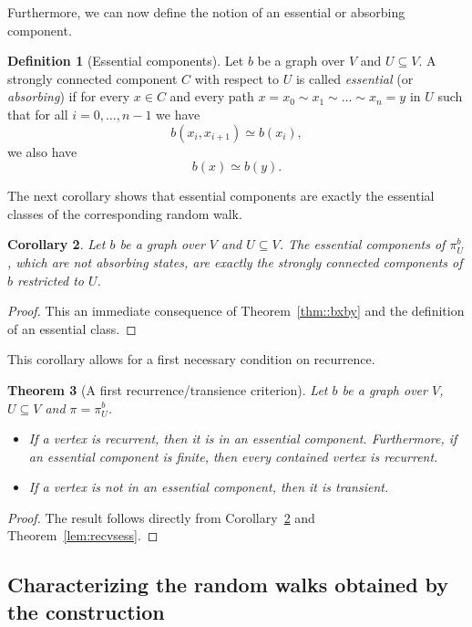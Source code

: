 \documentclass[a4paper,oneside, 12pt]{amsart}
\newtheorem{theorem}{Theorem}
\numberwithin{theorem}{section}
\newtheorem{corollary}[theorem]{Corollary}
\theoremstyle{definition}
\newtheorem{definition}[theorem]{Definition}
\newcommand{\subsV}{U}
\begin{document}
{Furthermore, we can now define the notion of an essential or absorbing component.
\begin{definition}[Essential components]\label{def::StronglyCCGr}
	Let $b$ be a  graph over $V$ and $\subsV\subseteq V$.  A {strongly connected component $ C $ with respect to $U$} is called \emph{essential} (or \emph{absorbing}) if for every $ x\in C $ and every path $
	x=x_0\sim x_1\sim\dots \sim x_n=y
	$  in $ U $ such that
	for all $i={0,\ldots, n-1}$  we have $$  b(x_i,x_{i+1})\simeq b(x_{i}), $$
	we also have
	$$ b(x)\simeq b(y). $$
\end{definition}

The next corollary shows that essential components are exactly  the essential classes of the corresponding random walk. 

\begin{corollary}\label{Corollary:essentialclasses}Let $b$ be a  graph over $V$ and $\subsV\subseteq V$. 
	The essential components of $ \pi_{U}^{b}$, which are not absorbing states, are exactly the strongly connected components of $b$ restricted to  $\subsV$.
\end{corollary}
\begin{proof}
This an immediate consequence of Theorem~\ref{thm::bxby} and the definition of an essential class.
\end{proof}

This corollary allows  for a first necessary condition on recurrence.
\begin{theorem}[A first recurrence/transience criterion]\label{thm:rectranscomponent} Let $b$ be a  graph over $V$, $\subsV\subseteq V$ and $ \pi =  \pi_{U}^{b} $.
	\begin{itemize}
		\item [(a)] If a vertex is recurrent, then it is in an essential component. Furthermore, if an essential component is finite, then every contained vertex is recurrent.
		\item [(b)]  If a vertex is not in an essential component, then it is transient.
	\end{itemize}
\end{theorem}
\begin{proof}
The result follows directly from Corollary~\ref{Corollary:essentialclasses} and Theorem~\ref{lem:recvsess}.
\end{proof}


\subsection{Characterizing the random walks obtained by the construction}


}
\end{document}
